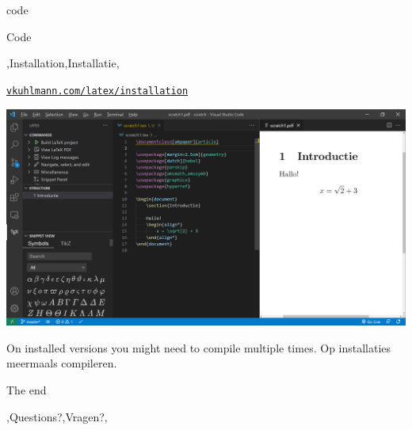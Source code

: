 \documentclass[presentatie.tex]{subfiles}
\begin{document}
\lang
{
    \section{\texorpdfstring{}{Good to know}}
}
{
    \section{\texorpdfstring{}{Goed om te weten}}%
}

\clearrecentlist


\begin{saveblock}{code}
	\begin{highlightblock}[gobble=8,linewidth=0.5\textwidth,framexleftmargin=0.25em]
        Code
	\end{highlightblock}
\end{saveblock}

\begin{frame}
    {\lang,Installation,Installatie,}

    \href{https://vkuhlmann.com/latex/installation}{\nolinkurl{vkuhlmann.com/latex/installation}}

    \includegraphics[width=\linewidth,height=0.8\textheight,keepaspectratio]{assets/Misc/VisualStudioCodeDemo.png}
\end{frame}

\begin{frame}
    \lang
    {On installed versions you might need to compile multiple times.}
    {Op installaties meermaals compileren.}
\end{frame}

\begin{frame}{The end}
	\begin{center}
		\LARGE \lang,Questions?,Vragen?,
	\end{center}

    \bigskip

    \begin{center}
    \end{center}
\end{frame}
\end{document}
